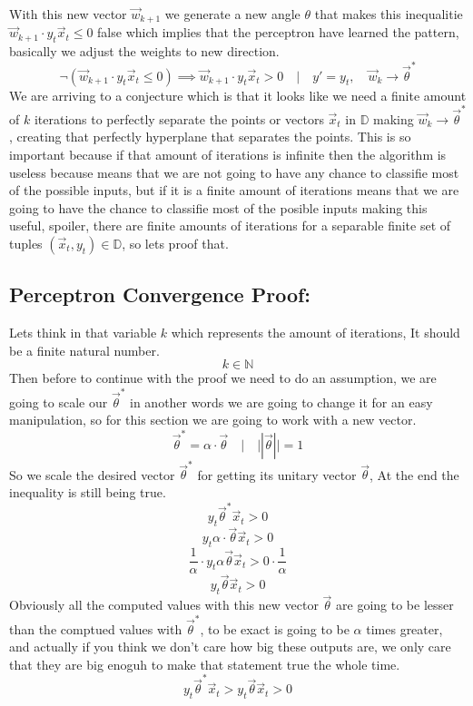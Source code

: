 \documentclass[12pt]{article}
\begin{document}
With this new vector $\vec{w}_{k+1}$ we generate a new angle $\theta$ that makes
this inequalitie $\vec{w}_{k+1} \cdot y_t\vec{x}_t \le 0$
false 
which implies that the perceptron have learned the pattern, basically we adjust the weights
 to new direction.
\[
  \neg (\vec{w}_{k+1} \cdot y_t\vec{x}_t \le 0) \implies \vec{w}_{k+1} \cdot y_t\vec{x}_t > 0\quad |
  \quad y' = y_t, \quad \vec{w}_k \rightarrow \vec{\theta}^*
\]
We are arriving to a conjecture which is that it looks like we need a finite amount of $k$
iterations to perfectly separate the points or vectors $\vec{x}_t$ in $\mathbb{D}$
making $\vec{w}_k \rightarrow \vec{\theta}^*$, creating that perfectly
hyperplane that separates the points.
This is so important because if that amount of iterations is infinite then the
algorithm is useless because means that we are not going to have any chance to classifie most of
the possible inputs,
but if it is a finite amount of iterations means that we are going to have the chance to
classifie most of the posible inputs
making this useful,  spoiler, there are finite amounts of iterations for a separable finite
set of tuples $(\vec{x}_t, y_t) \in \mathbb{D}$, so lets proof that.
\subsection{Perceptron Convergence Proof:}
Lets think in that variable $k$ which represents the amount of iterations,
It should be a finite natural number.
\[
  k \in \mathbb{N}
\]
Then before to continue with the proof we need to do an assumption,
we are going to scale our $\vec{\theta}^*$ in another words we are going to change it
for an easy manipulation,
so for this section we are going to work with a new vector.
\[
  \vec{\theta}^* = \alpha \cdot \vec{\theta}\quad |\quad ||\vec{\theta}|| = 1
\]
So we scale the desired vector $\vec{\theta}^*$ for getting its unitary vector $\vec{\theta}$,
At the end the inequality is still being true.
\[
  y_t\vec{\theta}^*\vec{x}_t > 0
\]
\[
  y_t\alpha\cdot\vec{\theta}\vec{x}_t > 0
\]
\[
  \frac{1}{\alpha} \cdot y_t\alpha\vec{\theta}\vec{x}_t > 0 \cdot \frac{1}{\alpha}
\]
\[
  y_t\vec{\theta}\vec{x}_t > 0
\]
Obviously all the computed values with this new vector $\vec{\theta}$ are going to be lesser than
the comptued values with $\vec{\theta}^*$, to be exact is going to be $\alpha$ times greater, and
actually if you think we don't care how big these outputs are, we only care
that they are big enoguh to make that statement true the whole time.
\[
  y_t\vec{\theta}^*\vec{x}_t > y_t\vec{\theta}\vec{x}_t > 0
\]
\end{document}
